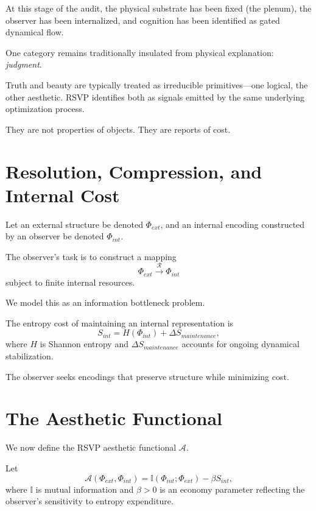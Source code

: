 \documentclass[11pt]{book}
\begin{document}
At this stage of the audit, the physical substrate has been fixed (the plenum),
the observer has been internalized, and cognition has been identified as gated
dynamical flow.

One category remains traditionally insulated from physical explanation:
\emph{judgment}.

Truth and beauty are typically treated as irreducible primitives—one logical,
the other aesthetic. RSVP identifies both as signals emitted by the same
underlying optimization process.

They are not properties of objects.
They are reports of cost.

\section{Resolution, Compression, and Internal Cost}

Let an external structure be denoted \(\Phi_{ext}\), and an internal encoding
constructed by an observer be denoted \(\Phi_{int}\).

The observer’s task is to construct a mapping
\[
\Phi_{ext} \xrightarrow{\mathcal{R}} \Phi_{int}
\]
subject to finite internal resources.

We model this as an information bottleneck problem.

\begin{definition}
The entropy cost of maintaining an internal representation is
\[
S_{int} = H(\Phi_{int}) + \Delta S_{maintenance},
\]
where \(H\) is Shannon entropy and \(\Delta S_{maintenance}\) accounts for
ongoing dynamical stabilization.
\end{definition}

The observer seeks encodings that preserve structure while minimizing cost.

\section{The Aesthetic Functional}

We now define the RSVP aesthetic functional \(\mathcal{A}\).

\begin{definition}
Let
\[
\mathcal{A}(\Phi_{ext}, \Phi_{int})
=
\mathbb{I}(\Phi_{int}; \Phi_{ext}) - \beta S_{int},
\]
where \(\mathbb{I}\) is mutual information and \(\beta > 0\) is an economy
parameter reflecting the observer’s sensitivity to entropy expenditure.
\end{definition}
\end{document}

